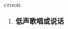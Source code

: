 
\begin{frame}
{\huge croon}
\begin{center}
\begin{enumerate}\Large
  \item \textbf{低声歌唱或说话}
\end{enumerate}
\end{center}
\end{frame}
